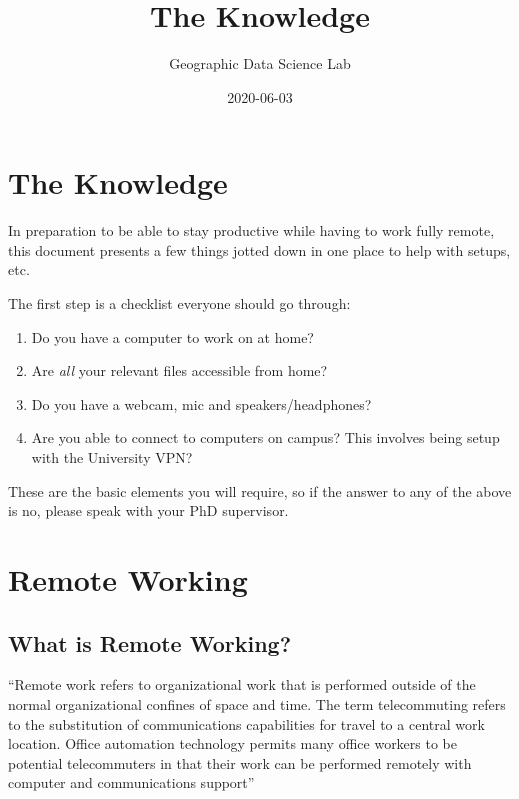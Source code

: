 \documentclass[
]{book}
\title{The Knowledge}
\author{Geographic Data Science Lab}
\date{2020-06-03}
\providecommand{\tightlist}{%
  \setlength{\itemsep}{0pt}\setlength{\parskip}{0pt}}
\begin{document}
\maketitle

{
\setcounter{tocdepth}{1}
\tableofcontents
}
\hypertarget{the-knowledge}{%
\chapter{The Knowledge}\label{the-knowledge}}

In preparation to be able to stay productive while having to work fully remote, this document presents a few things jotted down in one place to help with setups, etc.

The first step is a checklist everyone should go through:

\begin{enumerate}
\def\labelenumi{\arabic{enumi}.}
\tightlist
\item
  Do you have a computer to work on at home?
\item
  Are \emph{all} your relevant files accessible from home?
\item
  Do you have a webcam, mic and speakers/headphones?
\item
  Are you able to connect to computers on campus? This involves being setup with the University VPN?
\end{enumerate}

These are the basic elements you will require, so if the answer to any of the above is no, please speak with your PhD supervisor.

\hypertarget{remote-working}{%
\chapter{Remote Working}\label{remote-working}}

\hypertarget{what-is-remote-working}{%
\section{What is Remote Working?}\label{what-is-remote-working}}

``Remote work refers to organizational work that is performed outside of the normal organizational confines of space and time. The term telecommuting refers to the substitution of communications capabilities for travel to a central work location. Office automation technology permits many office workers to be potential telecommuters in that their work can be performed remotely with computer and communications support'' \citep{olson1983remote}
\end{document}
